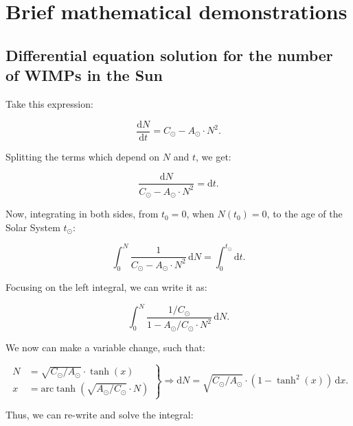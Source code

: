 \chapter{Brief mathematical demonstrations}

\clearpage
\section{Differential equation solution for the number of WIMPs in the Sun}
\label{app:diff}

Take this expression:

\begin{equation}
	\frac{\mathrm{d}N}{\mathrm{d}t} = C_\odot - A_\odot \cdot N^2.
\end{equation}

Splitting the terms which depend on $N$ and $t$, we get:

\begin{equation}
	\frac{\mathrm{d}N}{C_\odot - A_\odot \cdot N^2} = \mathrm{d}t.
\end{equation}

Now, integrating in both sides, from $t_0 = 0$, when $N(t_0) = 0$, to the age of the Solar System $t_\odot$:

\begin{equation}
	\label{eq:int}
	\int_0^N \frac{1}{C_\odot - A_\odot \cdot N^2} \,\mathrm{d}N = \int_{0}^{t_\odot} \mathrm{d}t.
\end{equation}

Focusing on the left integral, we can write it as:

\begin{equation}
	\int_0^N \frac{1/C_\odot}{1 - A_\odot/C_\odot \cdot N^2} \, \mathrm{d}N .
\end{equation}

We now can make a variable change, such that:

\begin{equation}
	\left.
	\begin{aligned}
		N &= \sqrt{C_\odot/A_\odot} \cdot \tanh(x)\\
		x &= \textrm{arc}\tanh\left(\sqrt{A_\odot/C_\odot} \cdot N\right)  
	\end{aligned} \right\}
	\Longrightarrow \mathrm{d}N = \sqrt{C_\odot/A_\odot} \cdot \left(1-\tanh^2(x)\right)\, \mathrm{d}x.
\end{equation}

Thus, we can re-write and solve the integral:

